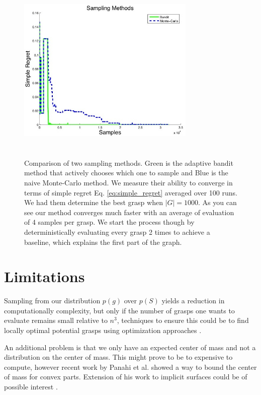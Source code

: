 \documentclass[letterpaper, 10 pt, conference]{ieeeconf}  %
\begin{document}
\begin{figure}[ht!]
\centering
\includegraphics[width=8.5cm,height=9cm]{figures/Slide09.jpg}
\caption{ \footnotesize Comparison of two sampling methods. Green is the adaptive bandit method that actively chooses which one to sample and Blue is the naive Monte-Carlo method. We measure their ability to converge in terms of simple regret Eq. \ref{eq:simple_regret} averaged over 100 runs. We had them determine the best grasp when $|G|=1000$. As you can see our method converges much faster with an average of evaluation of 4 samples per grasp. We start the process though by deterministically evaluating every grasp 2 times to achieve a baseline, which explains the first part of the graph.}
\vspace*{-10pt}
\label{fig:simple_regret}
\end{figure}







\section{Limitations} 
Sampling from our distribution $p(g)$ over $p(S)$ yields a reduction in computationally complexity, but only if the number of grasps one wants to evaluate remains small relative to $n^3$, techniques to ensure this could be to find locally optimal potential grasps using optimization approaches \cite{jeffs}. 

An additional problem is that we only have an expected center of mass and not a distribution on the center of mass. This might prove to be to expensive to compute, however recent work by Panahi et al. showed a way to bound the center of mass for convex parts. Extension of his work to implicit surfaces could be of possible interest \cite{panahi2014bounding}.  
\end{document}
